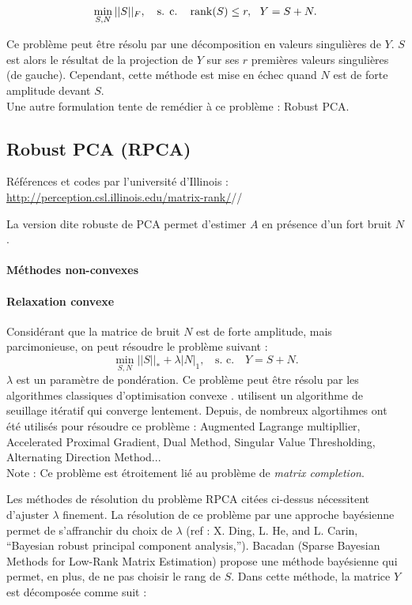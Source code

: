 \begin{equation}
    \min_{S,N} || S ||_F, ~~~\text{s. c.~~~} \operatorname{rank}(S) \le r ,~~Y=S+N.
\end{equation}

Ce problème peut être résolu par une décomposition en valeurs singulières de $Y$. $S$ est alors le résultat de la projection de $Y$ sur ses $r$ premières valeurs singulières (de gauche).
Cependant, cette méthode est mise en échec quand $N$ est de forte amplitude devant $S$. \\
Une autre formulation tente de remédier à ce problème : Robust PCA.

\subsection{Robust PCA (RPCA)}
Références et codes par l'université d'Illinois : \url{http://perception.csl.illinois.edu/matrix-rank/}//

La version dite robuste de PCA permet d'estimer $A$ en présence d'un fort bruit $N$.

\paragraph{\tbullet Méthodes non-convexes}


\paragraph{\tbullet Relaxation convexe}

Considérant que la matrice de bruit $N$  est de forte amplitude, mais parcimonieuse, on peut résoudre le problème suivant \citep{Wright2009a} : 
\begin{equation}
    \min_{S,N} ||S||_* + \lambda|N|_1,~~~~\text{s. c.~~~}Y=S+N.
\end{equation}
$\lambda$ est un paramètre de pondération.
Ce problème peut être résolu par les algorithmes classiques d'optimisation convexe .
 \cite{Wright2009a} utilisent un algorithme de seuillage itératif qui converge lentement. Depuis, de nombreux algortihmes ont été utilisés pour résoudre ce problème :  Augmented Lagrange multipllier,  Accelerated Proximal Gradient,  Dual Method, Singular Value Thresholding, Alternating Direction Method...\\
 
 Note : Ce problème est étroitement lié au problème de \textit{matrix completion}.	

Les méthodes de résolution du problème RPCA citées ci-dessus nécessitent d'ajuster $\lambda$  finement. La résolution de ce problème par une approche bayésienne permet de s'affranchir du choix de $\lambda$ (ref : X. Ding, L. He, and L. Carin, “Bayesian robust principal component  analysis,”). Bacadan (Sparse Bayesian Methods for Low-Rank Matrix Estimation) propose une méthode bayésienne qui permet, en plus, de ne pas choisir le rang de $S$. Dans cette méthode, la matrice $Y$ est décomposée comme suit : 

